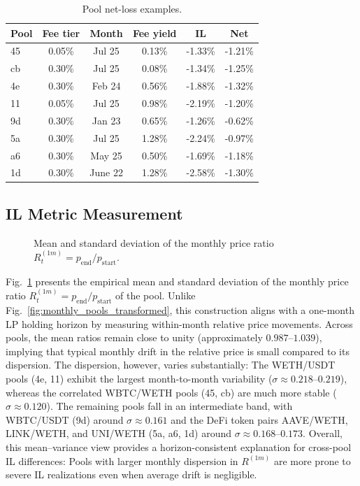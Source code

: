 \documentclass[journal]{IEEEtran}
\begin{document}
\begin{table}[t]
\centering
\footnotesize
\begin{tabular}{lccccc}
\toprule
Pool & Fee tier & Month & Fee yield & IL & Net \\
\midrule
45 & 0.05\% & Jul 25 & 0.13\% & -1.33\% & -1.21\% \\
cb & 0.30\% & Jul 25 & 0.08\% & -1.34\% & -1.25\% \\
4e & 0.30\% & Feb 24 & 0.56\% & -1.88\% & -1.32\% \\
11 & 0.05\% & Jul 25 & 0.98\% & -2.19\% & -1.20\% \\
9d & 0.30\% & Jan 23 & 0.65\% & -1.26\% & -0.62\% \\
5a & 0.30\% & Jul 25 & 1.28\% & -2.24\% & -0.97\% \\
a6 & 0.30\% & May 25 & 0.50\% & -1.69\% & -1.18\% \\
1d & 0.30\% & June 22 & 1.28\% & -2.58\% & -1.30\% \\
\bottomrule
\end{tabular}
\caption{Pool net-loss examples.}
\label{tab:worst_net_loss}
\end{table}


\subsection{IL Metric Measurement}

\begin{figure}[ht]
    \centering
    \resizebox{0.5\textwidth}{!}{%
        
    }
    \caption{Mean and standard deviation of the monthly price ratio \(R^{(1m)}_t=p_{\mathrm{end}}/p_{\mathrm{start}}\).}
    \label{fig:mean_std_R}
\end{figure}



Fig.~\ref{fig:mean_std_R} presents the empirical mean and standard deviation of the monthly price ratio
\(R^{(1m)}_t = p_{\mathrm{end}}/p_{\mathrm{start}}\) of the pool.
Unlike Fig.~\ref{fig:monthly_pools_transformed}, this construction aligns with a one-month LP holding horizon by measuring within-month relative price movements.
Across pools, the mean ratios remain close to unity (approximately \(0.987\)–\(1.039\)), implying that typical monthly drift in the relative price is small compared to its dispersion.
The dispersion, however, varies substantially: The WETH/USDT pools (4e, 11) exhibit the largest month-to-month variability
(\(\sigma \approx 0.218\)–\(0.219\)), whereas the correlated WBTC/WETH pools (45, cb) are much more stable
(\(\sigma \approx 0.120\)).
The remaining pools fall in an intermediate band, with WBTC/USDT (9d) around \(\sigma \approx 0.161\) and the DeFi token pairs AAVE/WETH, LINK/WETH, and UNI/WETH (5a, a6, 1d) around \(\sigma \approx 0.168\)–\(0.173\).
Overall, this mean--variance view provides a horizon-consistent explanation for cross-pool IL differences: Pools with larger monthly dispersion in \(R^{(1m)}\) are more prone to severe IL realizations even when average drift is negligible.
\end{document}
